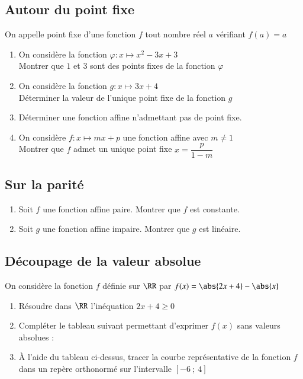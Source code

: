 \documentclass[oneside,12pt]{article}          %
\begin{document}
\subsection{Autour du point fixe}
On appelle point fixe d'une fonction $f$ tout nombre réel $a$ vérifiant $f(a)=a$
\begin{enumerate}
	\item On considère la fonction $\varphi:x\mapsto x^2-3x+3$\\
	Montrer que $1$ et $3$ sont des points fixes de la fonction $\varphi$
	\item On considère la fonction $g:x\mapsto 3x+4$\\
	Déterminer la valeur de l'unique point fixe de la fonction $g$
	\item Déterminer une fonction affine n'admettant pas de point fixe.
	\item On considère $f:x\mapsto mx+p$ une fonction affine avec $m\neq1$\\
	Montrer que $f$ admet un unique point fixe $x=\dfrac{p}{1-m}$
\end{enumerate}



\subsection{Sur la parité}
\begin{enumerate}
	\item Soit $f$ une fonction affine paire. Montrer que $f$ est constante.
	\item Soit $g$ une fonction affine impaire. Montrer que $g$ est linéaire.
\end{enumerate}



\subsection{Découpage de la valeur absolue}
On considère la fonction $f$ définie sur $\RR$ par $f(x)=\abs{2x+4}-\abs{x}$
\begin{enumerate}
	\item Résoudre dans $\RR$ l'inéquation $2x+4\geq0$
	\item Compléter le tableau suivant permettant d'exprimer $f(x)$ sans valeurs absolues :
	
	\item À l'aide du tableau ci-dessus, tracer la courbe représentative de la fonction $f$ dans un repère orthonormé sur l'intervalle $[-6~;~4]$
\end{enumerate}
\end{document}
